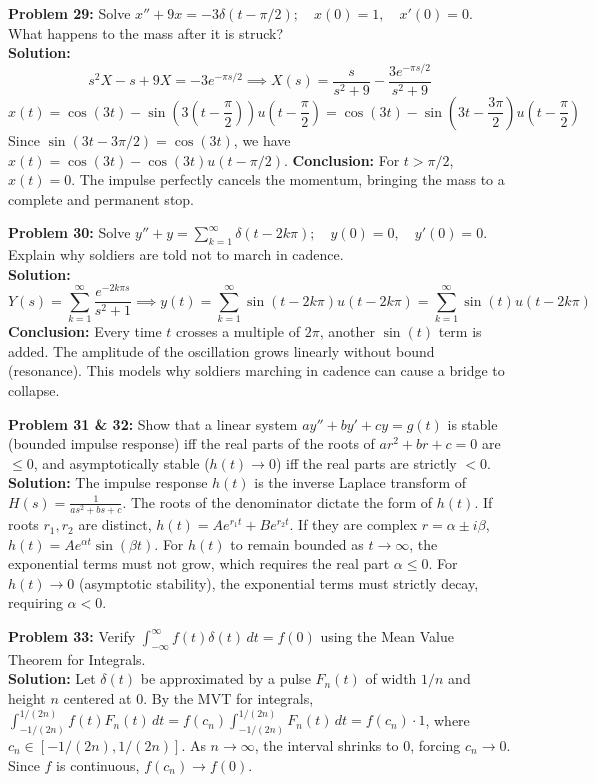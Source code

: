 \documentclass[11pt, letterpaper]{article}
\theoremstyle{definition}
\theoremstyle{remark}
\begin{document}
\textbf{Problem 29:} Solve $x'' + 9x = -3\delta(t - \pi/2); \quad x(0) = 1, \quad x'(0) = 0$. What happens to the mass after it is struck?
\\[4pt]
\textbf{Solution:} 
\[ s^2 X - s + 9X = -3e^{-\pi s/2} \implies X(s) = \frac{s}{s^2+9} - \frac{3e^{-\pi s/2}}{s^2+9} \]
\[ x(t) = \cos(3t) - \sin\left(3\left(t - \frac{\pi}{2}\right)\right)u\left(t - \frac{\pi}{2}\right) = \cos(3t) - \sin\left(3t - \frac{3\pi}{2}\right)u\left(t - \frac{\pi}{2}\right) \]
Since $\sin(3t - 3\pi/2) = \cos(3t)$, we have $x(t) = \cos(3t) - \cos(3t)u(t - \pi/2)$. 
\textbf{Conclusion:} For $t > \pi/2$, $x(t) = 0$. The impulse perfectly cancels the momentum, bringing the mass to a complete and permanent stop.

\textbf{Problem 30:} Solve $y'' + y = \sum_{k=1}^{\infty} \delta(t - 2k\pi); \quad y(0) = 0, \quad y'(0) = 0$. Explain why soldiers are told not to march in cadence.
\\[4pt]
\textbf{Solution:} 
\[ Y(s) = \sum_{k=1}^{\infty} \frac{e^{-2k\pi s}}{s^2+1} \implies y(t) = \sum_{k=1}^{\infty} \sin(t - 2k\pi)u(t - 2k\pi) = \sum_{k=1}^{\infty} \sin(t)u(t - 2k\pi) \]
\textbf{Conclusion:} Every time $t$ crosses a multiple of $2\pi$, another $\sin(t)$ term is added. The amplitude of the oscillation grows linearly without bound (resonance). This models why soldiers marching in cadence can cause a bridge to collapse.

\textbf{Problem 31 \& 32:} Show that a linear system $ay''+by'+cy=g(t)$ is stable (bounded impulse response) iff the real parts of the roots of $ar^2+br+c=0$ are $\le 0$, and asymptotically stable ($h(t) \to 0$) iff the real parts are strictly $< 0$.
\\[4pt]
\textbf{Solution:} The impulse response $h(t)$ is the inverse Laplace transform of $H(s) = \frac{1}{as^2+bs+c}$. The roots of the denominator dictate the form of $h(t)$. If roots $r_1, r_2$ are distinct, $h(t) = A e^{r_1 t} + B e^{r_2 t}$. If they are complex $r = \alpha \pm i\beta$, $h(t) = A e^{\alpha t}\sin(\beta t)$. 
For $h(t)$ to remain bounded as $t \to \infty$, the exponential terms must not grow, which requires the real part $\alpha \le 0$. For $h(t) \to 0$ (asymptotic stability), the exponential terms must strictly decay, requiring $\alpha < 0$.

\textbf{Problem 33:} Verify $\int_{-\infty}^{\infty} f(t)\delta(t) \, dt = f(0)$ using the Mean Value Theorem for Integrals.
\\[4pt]
\textbf{Solution:} Let $\delta(t)$ be approximated by a pulse $F_n(t)$ of width $1/n$ and height $n$ centered at $0$. By the MVT for integrals, $\int_{-1/(2n)}^{1/(2n)} f(t)F_n(t) \, dt = f(c_n) \int_{-1/(2n)}^{1/(2n)} F_n(t) \, dt = f(c_n) \cdot 1$, where $c_n \in [-1/(2n), 1/(2n)]$. As $n \to \infty$, the interval shrinks to $0$, forcing $c_n \to 0$. Since $f$ is continuous, $f(c_n) \to f(0)$.
\end{document}
